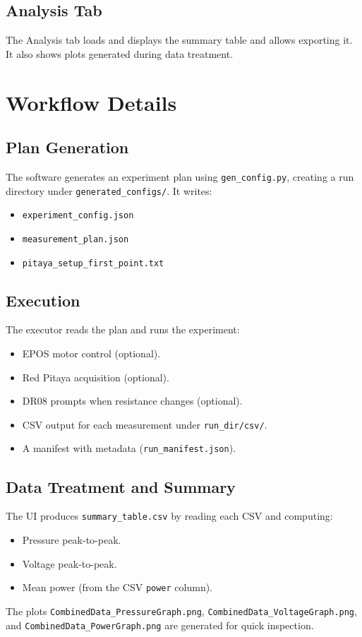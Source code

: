 \documentclass[11pt,a4paper]{article}
\begin{document}
\subsection{Analysis Tab}
The Analysis tab loads and displays the summary table and allows exporting it. It also shows plots generated during data treatment.

\section{Workflow Details}
\subsection{Plan Generation}
The software generates an experiment plan using \texttt{gen\_config.py}, creating a run directory under \texttt{generated\_configs/}. It writes:
\begin{itemize}[leftmargin=*]
\item \texttt{experiment\_config.json}
\item \texttt{measurement\_plan.json}
\item \texttt{pitaya\_setup\_first\_point.txt}
\end{itemize}

\subsection{Execution}
The executor reads the plan and runs the experiment:
\begin{itemize}[leftmargin=*]
\item EPOS motor control (optional).
\item Red Pitaya acquisition (optional).
\item DR08 prompts when resistance changes (optional).
\item CSV output for each measurement under \texttt{run\_dir/csv/}.
\item A manifest with metadata (\texttt{run\_manifest.json}).
\end{itemize}

\subsection{Data Treatment and Summary}
The UI produces \texttt{summary\_table.csv} by reading each CSV and computing:
\begin{itemize}[leftmargin=*]
\item Pressure peak-to-peak.
\item Voltage peak-to-peak.
\item Mean power (from the CSV \texttt{power} column).
\end{itemize}
The plots \texttt{CombinedData\_PressureGraph.png}, \texttt{CombinedData\_VoltageGraph.png}, and \texttt{CombinedData\_PowerGraph.png} are generated for quick inspection.
\end{document}
